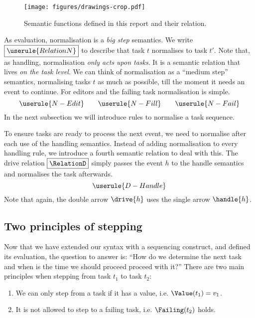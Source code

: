 \begin{figure}
  \centering
  \texttt{[image: figures/drawings-crop.pdf]}
  \caption{Semantic functions defined in this report and their relation.}
  \label{fig:semantic-functions}
\end{figure}

As evaluation,
normalisation is a \emph{big step} semantics.
We write $\boxed{\userule{RelationN}}$ to describe that
task $t$ normalises to task $t'$.
Note that, as handling,
normalisation \emph{only acts upon tasks}.
It is a semantic relation that lives \emph{on the task level}.
We can think of normalisation as a \enquote{medium step} semantics,
normalising tasks $t$ as much as possible,
till the moment it needs an event to continue.
For editors and the failing task normalisation is simple.
\begin{equation*}
  \userule{N-Edit} \qquad \userule{N-Fill} \qquad \userule{N-Fail}
\end{equation*}
In the next subsection we will introduce rules to normalise a task sequence.

To ensure tasks are ready to process the next event,
we need to normalise after each use of the handling semantics.
Instead of adding normalisation to every handling rule,
we introduce a fourth semantic relation to deal with this.
The drive relation $\boxed{\RelationD}$ simply passes the event $h$ to the handle semantics
and normalises the task afterwards.
\begin{equation*}
  \userule{D-Handle}
\end{equation*}
Note that again,
the double arrow $\drive{h}$ uses the single arrow $\handle{h}$.



\subsection{Two principles of stepping}
\label{sec:normalise-sequence}

Now that we have extended our syntax with a sequencing construct,
and defined its evaluation,
the question to answer is:
\enquote{How do we determine the next task
and when is the time we should proceed proceed with it?}
There are two main principles when stepping from task $t_1$ to task $t_2$:
\begin{enumerate}[S1]
  \item We can only step from a task if it has a value, i.e. $\Value(t_1) = v_1$. \label{itm:step1}
  \item It is not allowed to step to a failing task, i.e. $\Failing(t_2)$ holds. \label{itm:step2}
\end{enumerate}

